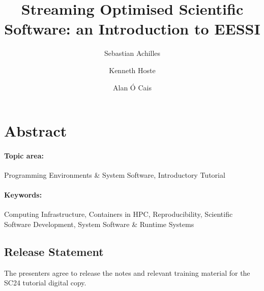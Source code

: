\documentclass[a4paper,11pt]{article}
\begin{document}

\title{
    \textbf{\LARGE Streaming Optimised Scientific Software: an Introduction to EESSI}\\
}

\date{}

\author[1]{Sebastian Achilles}
\author[2]{Kenneth Hoste}
\author[3]{Alan \'O Cais}


\renewcommand\Authands{ and }

\maketitle


\section*{Abstract}


\paragraph{Topic area:} Programming Environments \& System Software, Introductory Tutorial

\paragraph{Keywords:} Computing Infrastructure, Containers in HPC, Reproducibility, Scientific Software Development, System Software \& Runtime Systems







\newpage

\subsection*{Release Statement}

The presenters agree to release the notes and relevant training material for the SC24 tutorial digital copy.


\end{document}
